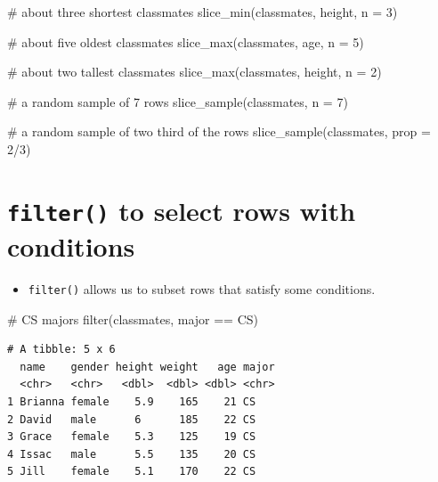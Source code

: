 \documentclass[
  letterpaper,
  DIV=11,
  numbers=noendperiod]{scrreprt}
\newenvironment{Shaded}{\begin{snugshade}}{\end{snugshade}}
\newcommand{\AttributeTok}[1]{\textcolor[rgb]{0.40,0.45,0.13}{#1}}
\newcommand{\CommentTok}[1]{\textcolor[rgb]{0.37,0.37,0.37}{#1}}
\newcommand{\DecValTok}[1]{\textcolor[rgb]{0.68,0.00,0.00}{#1}}
\newcommand{\FunctionTok}[1]{\textcolor[rgb]{0.28,0.35,0.67}{#1}}
\newcommand{\NormalTok}[1]{\textcolor[rgb]{0.00,0.23,0.31}{#1}}
\newcommand{\SpecialCharTok}[1]{\textcolor[rgb]{0.37,0.37,0.37}{#1}}
\newcommand{\StringTok}[1]{\textcolor[rgb]{0.13,0.47,0.30}{#1}}
\providecommand{\tightlist}{%
  \setlength{\itemsep}{0pt}\setlength{\parskip}{0pt}}\usepackage{longtable,booktabs,array}
\begin{document}
\begin{tcolorbox}
\begin{Shaded}
\begin{Highlighting}[]
\CommentTok{\# about three shortest classmates}
\FunctionTok{slice\_min}\NormalTok{(classmates, height, }\AttributeTok{n =} \DecValTok{3}\NormalTok{)}

\CommentTok{\# about five oldest classmates}
\FunctionTok{slice\_max}\NormalTok{(classmates, age, }\AttributeTok{n =} \DecValTok{5}\NormalTok{)}

\CommentTok{\# about two tallest classmates}
\FunctionTok{slice\_max}\NormalTok{(classmates, height, }\AttributeTok{n =} \DecValTok{2}\NormalTok{)}

\CommentTok{\# a random sample of 7 rows}
\FunctionTok{slice\_sample}\NormalTok{(classmates, }\AttributeTok{n =} \DecValTok{7}\NormalTok{)}

\CommentTok{\# a random sample of two third of the rows}
\FunctionTok{slice\_sample}\NormalTok{(classmates, }\AttributeTok{prop =} \DecValTok{2}\SpecialCharTok{/}\DecValTok{3}\NormalTok{)}
\end{Highlighting}
\end{Shaded}

\end{tcolorbox}

\section{\texorpdfstring{\texttt{filter()} to select rows with
conditions}{filter() to select rows with conditions}}\label{filter-to-select-rows-with-conditions}

\begin{itemize}
\tightlist
\item
  \texttt{filter()} allows us to subset rows that satisfy some
  conditions.
\end{itemize}

\begin{Shaded}
\begin{Highlighting}[]
\CommentTok{\# CS majors}
\FunctionTok{filter}\NormalTok{(classmates, major }\SpecialCharTok{==} \StringTok{\textquotesingle{}CS\textquotesingle{}}\NormalTok{)}
\end{Highlighting}
\end{Shaded}

\begin{verbatim}
# A tibble: 5 x 6
  name    gender height weight   age major
  <chr>   <chr>   <dbl>  <dbl> <dbl> <chr>
1 Brianna female    5.9    165    21 CS   
2 David   male      6      185    22 CS   
3 Grace   female    5.3    125    19 CS   
4 Issac   male      5.5    135    20 CS   
5 Jill    female    5.1    170    22 CS   
\end{verbatim}
\end{document}

